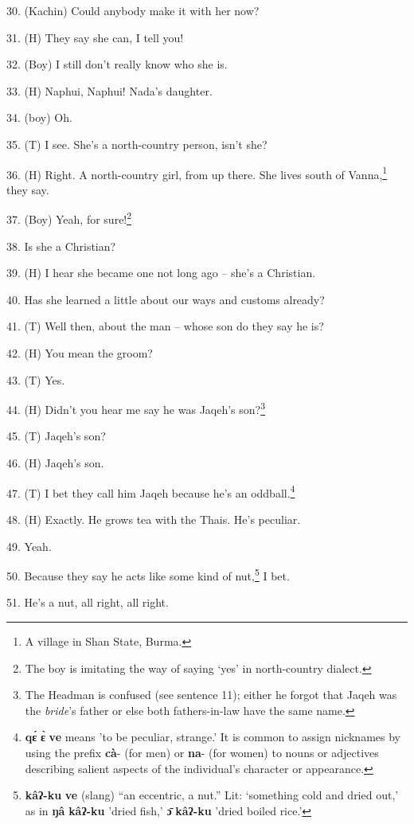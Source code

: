 30. (Kachin) Could anybody make it with her now?


31. (H) They say she can, I tell you!

32. (Boy) I still don't really know who she is.

33. (H) Naphui, Naphui! Nada's daughter.

34. (boy) Oh.

35. (T) I see. She's a north-country person, isn't she?

36. (H) Right. A north-country girl, from up there. She lives south of Vanna,\footnote{A village in Shan State, Burma.}
they say.

37. (Boy) Yeah, for sure!\footnote{The boy is imitating the way of saying `yes' in north-country dialect.}

38. Is she a Christian?

39. (H) I hear she became one not long ago -- she's a Christian.

40. Has she learned a little about our ways and customs already?

41. (T) Well then, about the man -- whose son do they say he is?

42. (H) You mean the groom?

43. (T) Yes.

44. (H) Didn't you hear me say he was Jaqeh's son?\footnote{The Headman is confused (see sentence 11); either he forgot that Jaqeh was the \textit{bride}'s father or else both fathers-in-law have the same name.}

45. (T) Jaqeh's son?

46. (H) Jaqeh's son.

47. (T) I bet they call him Jaqeh because he's an oddball.\footnote{\textbf{qɛ́} \textbf{ɛ̀} \textbf{ve} means 'to be peculiar, strange.' It is common to assign nicknames by using the prefix \textbf{cà}- (for men) or \textbf{na}- (for women) to nouns or adjectives describing salient aspects of the individual's character or appearance.}

48. (H) Exactly. He grows tea with the Thais. He's peculiar.

49. Yeah.

50. Because they say he acts like some kind of nut,\footnote{\textbf{kâʔ-ku} \textbf{ve} (slang) ``an eccentric, a nut.'' Lit: `something cold and dried out,' as in \textbf{ŋâ} \textbf{kâʔ-ku} 'dried fish,' \textbf{ɔ̄} \textbf{kâʔ-ku} 'dried boiled rice.'} I bet.

51. He's a nut, all right, all right.

